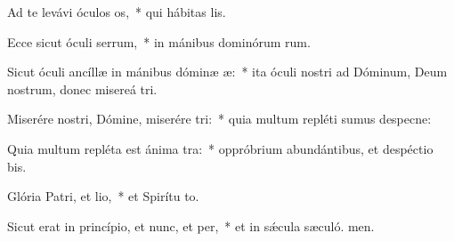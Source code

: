 \item Ad te levávi óculos os,~* qui hábitas  lis.
\item Ecce sicut óculi serrum,~* in mánibus dominórum rum.
\item Sicut óculi ancíllæ in mánibus dóminæ æ:~* ita óculi nostri ad Dóminum, Deum nostrum, donec misereá tri.
\item Miserére nostri, Dómine, miserére tri:~* quia multum repléti sumus despecne:
\item Quia multum repléta est ánima tra:~* oppróbrium abundántibus, et despéctio bis.
\item Glória Patri, et lio,~* et Spirítu to.
\item Sicut erat in princípio, et nunc, et per,~* et in sǽcula sæculó. men.

